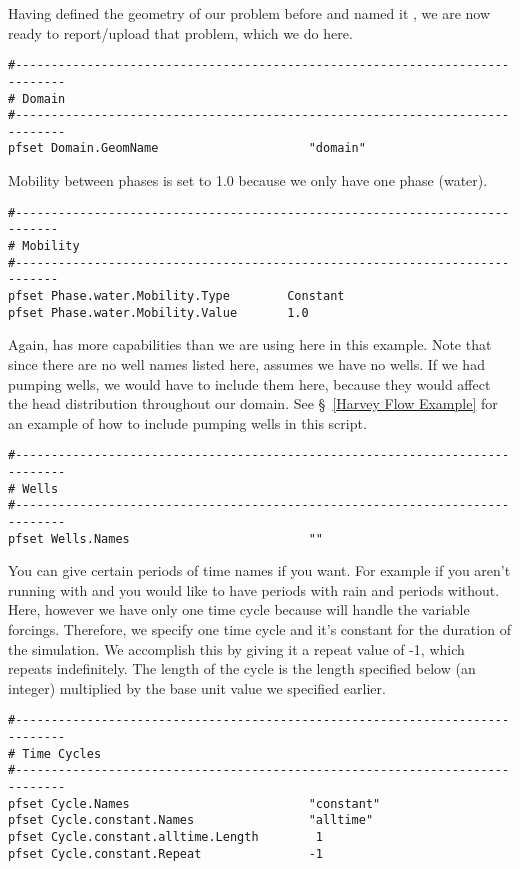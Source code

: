 Having defined the geometry of our problem before and named it , we are
now ready to report/upload that problem, which we do here.

\begin{verbatim}
#-----------------------------------------------------------------------------
# Domain
#-----------------------------------------------------------------------------
pfset Domain.GeomName                     "domain"
\end{verbatim}

Mobility between phases is set to 1.0 because we only have one phase (water).

\begin{verbatim}
#----------------------------------------------------------------------------
# Mobility
#----------------------------------------------------------------------------
pfset Phase.water.Mobility.Type        Constant
pfset Phase.water.Mobility.Value       1.0
\end{verbatim}

Again, \parflow{} has more capabilities than we are using here in this example. 
Note that since there are no well names listed here, \parflow{} assumes we have no wells. 
If we had pumping wells, we would have to include them here, because they 
would affect the head distribution throughout our domain.  See \S~\ref{Harvey Flow Example} 
for an example of how to include pumping wells in this script.

\begin{verbatim}
#-----------------------------------------------------------------------------
# Wells
#-----------------------------------------------------------------------------
pfset Wells.Names                         ""
\end{verbatim}

You can give certain periods of time names if you want. For example if you aren't running with  
and you would like to have periods with rain and periods without.   
Here, however we have only one time cycle because  will handle the variable forcings.
Therefore, we specify one time cycle and it's constant for the duration of the simulation. 
We accomplish this by giving it a repeat value of -1, which repeats indefinitely.  The length of 
the cycle is the length specified below (an integer) multiplied by the base unit value we specified earlier.

\begin{verbatim}
#-----------------------------------------------------------------------------
# Time Cycles
#-----------------------------------------------------------------------------
pfset Cycle.Names                         "constant"
pfset Cycle.constant.Names                "alltime"
pfset Cycle.constant.alltime.Length        1
pfset Cycle.constant.Repeat               -1
\end{verbatim}

